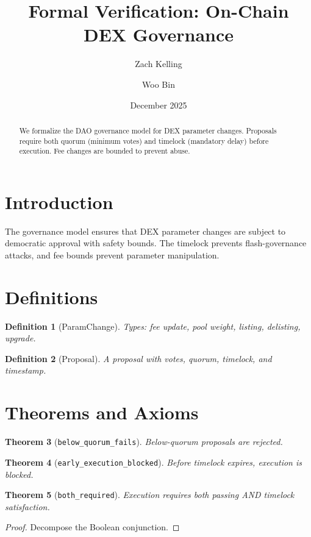 \documentclass[11pt]{article}
\title{Formal Verification: On-Chain DEX Governance}
\author{Zach Kelling \and Woo Bin}
\date{December 2025}
\newtheorem{theorem}{Theorem}
\newtheorem{definition}[theorem]{Definition}
\begin{document}
\maketitle

\begin{abstract}
We formalize the DAO governance model for DEX parameter changes. Proposals require both quorum (minimum votes) and timelock (mandatory delay) before execution. Fee changes are bounded to prevent abuse.
\end{abstract}

\section{Introduction}
The governance model ensures that DEX parameter changes are subject to democratic approval with safety bounds. The timelock prevents flash-governance attacks, and fee bounds prevent parameter manipulation.

\section{Definitions}
\begin{definition}[ParamChange]
Types: fee update, pool weight, listing, delisting, upgrade.
\end{definition}

\begin{definition}[Proposal]
A proposal with votes, quorum, timelock, and timestamp.
\end{definition}


\section{Theorems and Axioms}
\begin{theorem}[\texttt{below\_quorum\_fails}]
Below-quorum proposals are rejected.
\end{theorem}

\begin{theorem}[\texttt{early\_execution\_blocked}]
Before timelock expires, execution is blocked.
\end{theorem}

\begin{theorem}[\texttt{both\_required}]
Execution requires both passing AND timelock satisfaction.
\end{theorem}
\begin{proof}
Decompose the Boolean conjunction.
\end{proof}
\end{document}
